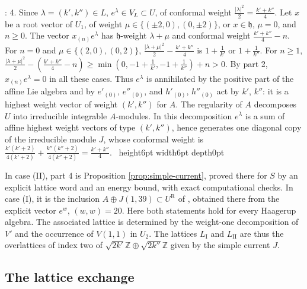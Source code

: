 \documentclass[leqno]{article}
\newcommand{\Z}{\ensuremath{\mathbb{Z}}}
\renewcommand{\geq}{\ensuremath{\geqslant}}
\newcommand{\qed}{\hfill \vrule height6pt  width6pt depth0pt}
\newenvironment{proof}[1][]{\noindent {\it Proof #1} : }{\hbox{~}\qed
\smallskip
}
\numberwithin{equation}{section}
\begin{document}
\begin{proof}
4. Since $\lambda = (k',k'') \in L$, $e^\lambda \in V_L \subset U$, of conformal weight $\frac{|\lambda|^2}2 = \frac{k'+k''}4$. Let $x$ be a root vector of $U_1$, of weight $\mu \in \{(\pm2,0),(0,\pm2)\}$, or $x \in \mathfrak h$, $\mu = 0$, and $n \geq 0$. The vector $x_{(n)}e^\lambda$ has $\mathfrak h$-weight $\lambda+\mu$ and conformal weight $\frac{k'+k''}4-n$. For $n = 0$ and $\mu \in \{(2,0),(0,2)\}$, $\frac{|\lambda+\mu|^2}2-\frac{k'+k''}4$ is $1+\frac1{k'}$ or $1+\frac1{k''}$. For $n \geq 1$, $\frac{|\lambda+\mu|^2}2-(\frac{k'+k''}4-n) \geq \min(0,-1+\frac1{k'},-1+\frac1{k''})+n > 0$. By part 2, $x_{(n)}e^\lambda = 0$ in all these cases. Thus $e^\lambda$ is annihilated by the positive part of the affine Lie algebra and by $e'_{(0)}$, $e''_{(0)}$, and $h'_{(0)}$, $h''_{(0)}$ act by $k'$, $k''$: it is a highest weight vector of weight $(k',k'')$ for $A$. The regularity of $A$ decomposes $U$ into irreducible integrable $A$-modules. In this decomposition $e^\lambda$ is a sum of affine highest weight vectors of type $(k',k'')$, hence generates one diagonal copy of the irreducible module $J$, whose conformal weight is $\frac{k'(k'+2)}{4(k'+2)}+\frac{k''(k''+2)}{4(k''+2)} = \frac{k'+k''}4$.
\end{proof}

In case (II), part 4 is Proposition \ref{prop:simple-current}, proved there for $S$ by an explicit lattice word and an energy bound, with exact computational checks. In case (I), it is the inclusion $A \oplus J(1,39) \subset U^{\mathrm R}$ of \cite[Proposition 7.1]{Rie26b}, obtained there from the explicit vector $e^w$, $(w,w) = 20$. Here both statements hold for every Haagerup algebra. The associated lattice is determined by the weight-one decomposition of $V'$ and the occurrence of $V(1,1)$ in $U_2$. The lattices $L_{\mathrm I}$ and $L_{\mathrm{II}}$ are thus the overlattices of index two of $\sqrt{2k'}\Z \oplus \sqrt{2k''}\Z$ given by the simple current $J$.

\subsection{The lattice exchange}
\end{document}
